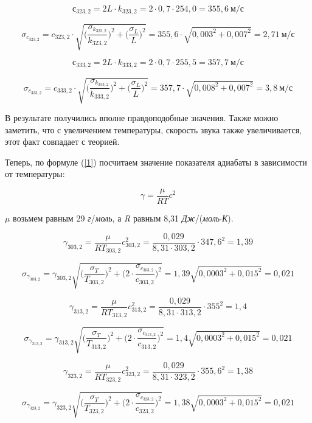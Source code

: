 \documentclass[12pt,a4paper]{article}
\begin{document}
\[с_{323,2} = 2L \cdot k_{323,2} = 2 \cdot 0,7 \cdot 254,0 = 355,6 \: \textit{м} / \textit{с}\]

\[\sigma_{c_{323,2}} = c_{323,2} \cdot \sqrt{\Big( \frac{\sigma_{k_{323,2}}}{k_{323,2}}\Big) ^2 + \Big( \frac{\sigma_L}{L}\Big) ^2} = 355,6 \cdot \sqrt{0,003^2 + 0,007^2} = 2,71 \: \textit{м} / \textit{с}\]

\[с_{333,2} = 2L \cdot k_{333,2} = 2 \cdot 0,7 \cdot 255,5 = 357,7 \: \textit{м} / \textit{с}\]

\[\sigma_{c_{333,2}} = c_{333,2} \cdot \sqrt{\Big( \frac{\sigma_{k_{333,2}}}{k_{333,2}}\Big) ^2 + \Big( \frac{\sigma_L}{L}\Big) ^2} = 357,7 \cdot \sqrt{0,008^2 + 0,007^2} = 3,8 \: \textit{м} / \textit{с}\]

\vspace{0.5cm}

В результате получились вполне правдоподобные значения. Также можно заметить, что с увеличением температуры, скорость звука также увеличивается, этот факт совпадает с теорией. 

Теперь, по формуле (\ref{1}) посчитаем значение показателя адиабаты в зависимости от температуры:

\[\gamma = \frac{\mu}{RT}c^2\]

$\mu$ возьмем равным 29 \textit{г}/\textit{моль}, а \textit{R} равным 8,31 \textit{Дж}/(\textit{моль}$\cdot$\textit{К}).

\[\gamma_{303,2} = \frac{\mu}{R T_{303,2}}c_{303,2}^2 = \frac{0,029}{8,31 \cdot 303,2} \cdot 347,6^2 = 1,39\] 

\[\sigma_{\gamma_{303,2}} = \gamma_{303,2} \sqrt{\Big( \frac{\sigma_T}{T_{303,2}}\Big)^2 + \Big(2 \cdot \frac{\sigma_{c_{303,2}}}{c_{303,2}} \Big)^2} = 1,39 \sqrt{0,0003^2 + 0,015^2} =  0,021\]

\[\gamma_{313,2} = \frac{\mu}{R T_{313,2}}c_{313,2}^2 = \frac{0,029}{8,31 \cdot 313,2} \cdot 355^2 = 1,4\] 

\[\sigma_{\gamma_{313,2}} = \gamma_{313,2} \sqrt{\Big( \frac{\sigma_T}{T_{313,2}}\Big)^2 + \Big(2 \cdot \frac{\sigma_{c_{313,2}}}{c_{313,2}} \Big)^2} = 1,4 \sqrt{0,0003^2 + 0,015^2} =  0,021\]

\[\gamma_{323,2} = \frac{\mu}{R T_{323,2}}c_{323,2}^2 = \frac{0,029}{8,31 \cdot 323,2} \cdot 355,6^2 = 1,38\] 

\[\sigma_{\gamma_{323,2}} = \gamma_{323,2} \sqrt{\Big( \frac{\sigma_T}{T_{323,2}}\Big)^2 + \Big(2 \cdot \frac{\sigma_{c_{323,2}}}{c_{323,2}} \Big)^2} = 1,38 \sqrt{0,0003^2 + 0,015^2} =  0,021\]
\end{document}
